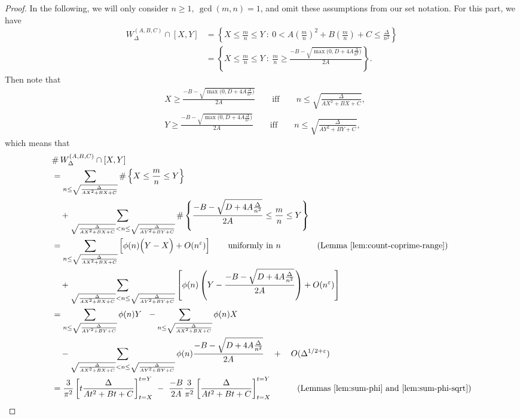 \documentclass[11pt,letterpaper,reqno]{amsart}
\numberwithin{equation}{section}
\numberwithin{figure}{section}
\numberwithin{table}{section}
\newcommand{\lrp}[1]{\left(#1\right)}
\newcommand{\lrb}[1]{\left[#1\right]}
\newcommand{\lrcb}[1]{\left\{#1\right\}}
\begin{document}
\begin{proof}
In the following, we will only consider $n \ge 1,~ \gcd(m,n)=1$, and omit these assumptions from our set notation.
For this part, we have
\begin{align}
    W_{\Delta}^{(A,B,C)} \cap [X,Y] 
    &= \lrcb{X \le \frac{m}{n} \le Y ~:~  0 < A \lrp{\frac{m}{n}}^2 + B \lrp{\frac{m}{n}} + C  \le \frac{\Delta}{n^2}
    } \\
    &= \lrcb{X \le \frac{m}{n} \le Y ~:~  \frac{m}{n} \ge \frac{-B-\sqrt{\max\big(0,D+4A\frac{\Delta}{n^2}\big)}}{2A}
    }. 
\end{align}
Then note that
\begin{align}
    &X \ge  \frac{-B-\sqrt{\max\big(0,D+4A\frac{\Delta}{n^2}\big)}}{2A}
     \qquad \text{iff}\qquad  n \le \sqrt{\frac{\Delta}{AX^2+BX+C}},
     \\
    &Y \ge  \frac{-B-\sqrt{\max\big(0,D+4A\frac{\Delta}{n^2}\big)}}{2A}
     \qquad \text{iff}\qquad  n \le \sqrt{\frac{\Delta}{AY^2+BY+C}},
\end{align}
which means that
\begin{align}
    & \#\, W_{\Delta}^{(A,B,C)} \cap [X,Y] \\
    &=
    \sum_{ n \le \sqrt{\frac{\Delta}{AX^2+BX+C}} }
    \# \lrcb{X \le \frac{m}{n} \le Y
    }
    \\
    &\quad+
    \sum_{
    \sqrt{\frac{\Delta}{AX^2+BX+C}} < n \le \sqrt{\frac{\Delta}{AY^2+BY+C}}}
    \#\lrcb{\frac{-B-\sqrt{D+4A\frac{\Delta}{n^2}}}{2A}  
    \le \frac{m}{n} \le Y
    } \\
    &=
    \sum_{ n \le \sqrt{\frac{\Delta}{AX^2+BX+C}} } 
    \lrb{
        \phi(n) \Big(Y-X\Big) + O(n^{\varepsilon})
    } \qquad \text{uniformly in $n$ \qquad\qquad (Lemma \ref{lem:count-coprime-range})} \\
    &\quad+
    \sum_{ \sqrt{\frac{\Delta}{AX^2+BX+C}} < n \le \sqrt{\frac{\Delta}{AY^2+BY+C}} }
    \lrb{\phi(n) \lrp{ 
        Y - 
        \frac{-B-\sqrt{D+4A\frac{\Delta}{n^2}}}{2A}
    }
    + O(n^{\varepsilon})
    }  \\
    &=
    \sum_{ n \le \sqrt{\frac{\Delta}{AY^2+BY+C}}} 
    \phi(n)Y \ \ - \sum_{ n \le \sqrt{\frac{\Delta}{AX^2+BX+C}}} 
    \phi(n)X \quad  \\
    &\quad-
    \sum_{ \sqrt{\frac{\Delta}{AX^2+BX+C}} < n \le \sqrt{\frac{\Delta}{AY^2+BY+C}} }
    \phi(n)  
    \frac{-B-\sqrt{D+4A\frac{\Delta}{n^2}}}{2A}
    \quad+ \quad O(\Delta^{1/2+\varepsilon})\\
    &= \frac{3}{\pi^2} \lrb{ t  \frac{\Delta}{At^2+Bt+C}}_{t=X}^{t=Y} ~-~ \frac{-B}{2A}\frac{3}{\pi^2} \lrb{  \frac{\Delta}{At^2+Bt+C}}_{t=X}^{t=Y} \qquad\quad \text{(Lemmas \ref{lem:sum-phi} and \ref{lem:sum-phi-sqrt})}

\end{align}
\end{proof}
\end{document}
